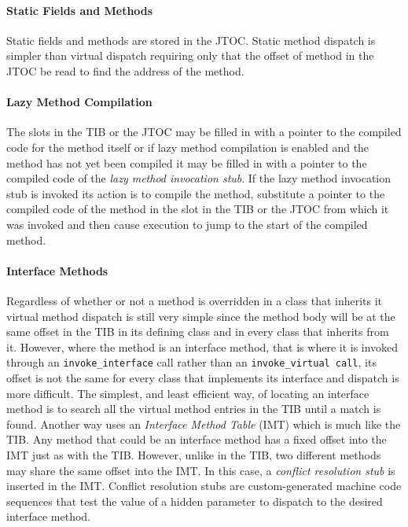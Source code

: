 \paragraph{Static Fields and Methods} 
Static fields and methods are stored in the JTOC. Static method dispatch is 
simpler than virtual dispatch requiring only that the offset of method in the 
JTOC be read to find the address of the method. 

\paragraph{Lazy Method Compilation}
The slots in the TIB or the JTOC may be filled in with 
a pointer to the compiled code for the method itself or if lazy method 
compilation is enabled and the method has not yet been compiled 
it may be filled in with
a pointer to the compiled code of the {\em lazy method invocation stub}.
If the lazy method invocation stub is invoked its action is to compile the 
method, substitute a pointer to the compiled code of the method in the slot in
the TIB or the JTOC from which it was invoked and then 
cause execution to jump to the start of the compiled method. 

\paragraph{Interface Methods}
Regardless of whether or not a method is overridden in a class that inherits it
virtual method dispatch is still very simple since the method body will be at
the same offset in the TIB in its defining class and in every class that 
inherits from it. 
However, where the method is an interface method, 
that is where it is invoked through an {\tt invoke\_interface} call rather than
an {\tt invoke\_virtual call}, its offset is not the same for every class that 
implements its interface and dispatch is more difficult.
The simplest, and least efficient way, of locating an interface method 
is to search all the virtual method entries in the TIB until a match is found.
Another way uses an {\em Interface Method Table} (IMT) which is much like the 
TIB. Any method that could be an interface method has a fixed offset into the 
IMT just as with the TIB. However, unlike in the TIB, two different methods may
share the same offset into the IMT. In this case, a {\em conflict resolution
stub} is inserted in the IMT. Conflict resolution stubs are
custom-generated machine code sequences that test the value of a
hidden parameter to dispatch to the desired interface method.

